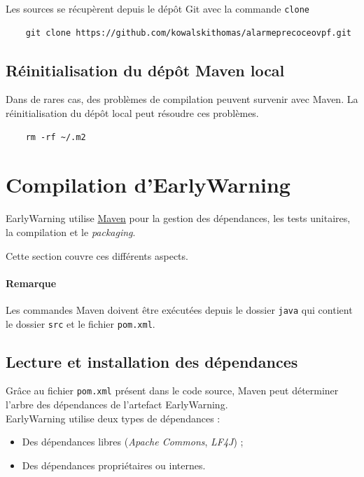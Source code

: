 \documentclass{article}
\begin{document}
Les sources se récupèrent depuis le dépôt Git avec la commande \texttt{clone}

\begin{verbatim}
    git clone https://github.com/kowalskithomas/alarmeprecoceovpf.git
\end{verbatim}

\subsection{Réinitialisation du dépôt Maven local}

Dans de rares cas, des problèmes de compilation peuvent survenir avec Maven. La réinitialisation du dépôt local peut résoudre ces problèmes.

\begin{verbatim}
    rm -rf ~/.m2
\end{verbatim}

\pagebreak
\section{Compilation d'EarlyWarning}

EarlyWarning utilise \hyperlink{https://maven.apache.org}{Maven}     pour la gestion des dépendances, les tests unitaires, la compilation et le \emph{packaging}.

Cette section couvre ces différents aspects. 

\paragraph{Remarque} Les commandes Maven doivent être exécutées depuis le dossier \texttt{java} qui contient le dossier \texttt{src} et le fichier \texttt{pom.xml}.

\subsection{Lecture et installation des dépendances}

Grâce au fichier \texttt{pom.xml} présent dans le code source, Maven peut déterminer l'arbre des dépendances de l'artefact EarlyWarning. \\

EarlyWarning utilise deux types de dépendances :

\begin{itemize}
    \item Des dépendances libres (\emph{Apache Commons}, \emph{LF4J}) ;
    \item Des dépendances propriétaires ou internes. 
\end{itemize}
\end{document}
